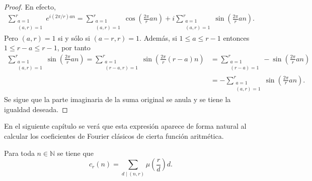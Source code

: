 \begin{proof}
En efecto,
\begin{align*}
    \sum_{\substack{a=1 \\ (a,r)=1}}^{r} e^{i(2 \pi / r) a n} = \sum_{\substack{a=1 \\ (a,r)=1}}^{r} \cos \left( \frac{2 \pi}{r} a n \right) + i \sum_{\substack{a=1 \\ (a,r)=1}}^{r} \sin \left( \frac{2 \pi}{r} a n \right).
\end{align*}
Pero $(a,r)=1$ si y sólo si $(a-r,r)=1$. Además, si $1 \le a \le r-1$ entonces $1 \le r-a \le r-1$, por tanto
\begin{align*}
    \sum_{\substack{a=1 \\ (a,r)=1}}^{r} \sin \left( \frac{2 \pi}{r} a n \right) = \sum_{\substack{a=1 \\ (r-a,r)=1}}^{r} \sin \left( \frac{2 \pi}{r} (r-a) n \right) & = \sum_{\substack{a=1 \\ (r-a)=1}}^{r} - \sin \left( \frac{2 \pi}{r} a n \right) \\
                                                                                 &= - \sum_{\substack{a=1 \\ (a,r)=1}}^{r} \sin \left( \frac{2 \pi}{r} a n \right).
\end{align*}
Se sigue que la parte imaginaria de la suma original se anula y se tiene la igualdad deseada.
\end{proof}

En el siguiente capítulo se verá que esta expresión aparece de forma natural al calcular los coeficientes de Fourier clásicos de cierta función aritmética.

\begin{proposition}
Para toda $n \in \mathbb{N}$ se tiene que
\begin{equation*}
    c_r(n) = \sum_{d \mid (n,r)} \mu \left( \frac{r}{d} \right) d.
\end{equation*}
\end{proposition}


